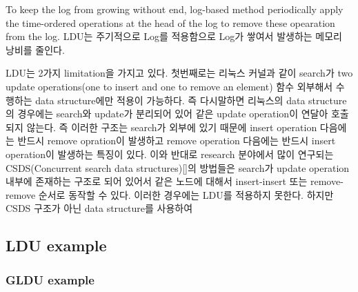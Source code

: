 \ifkor
To keep the log from growing without end, log-based method periodically  apply
the time-ordered operations at the head of the log to remove these opearation
from the log. LDU는 주기적으로 Log를 적용함으로 Log가 쌓여서 발생하는 메모리 낭비를 줄인다.
\else
\fi







\ifkor
LDU는 2가지 limitation을 가지고 있다.  
첫번째로는 리눅스 커널과 같이 search가 two update operations(one to insert and one to remove
an element) 함수 외부해서 수행하는 data structure에만 적용이 가능하다.
즉 다시말하면 리눅스의 data structure의 경우에는 search와 update가 분리되어 있어 같은 update operation이
연달아 호출되지 않는다.
즉 이러한 구조는 search가 외부에 있기 때문에 insert operation 다음에는 반드시  remove opration이 발생하고 
remove operation 다음에는 반드시 insert operation이 발생하는 특징이 있다.
이와 반대로 research 분야에서 많이 연구되는 CSDS(Concurrent search data structures)[]의 방법들은
search가 update operation 내부에 존재하는 구조로 되어 있어서 같은 노드에 대해서 insert-insert 또는
remove-remove 순서로 동작할 수 있다.
이러한 경우에는 LDU를 적용하지 못한다.
하지만 CSDS 구조가 아닌 data structure를 사용하여 
\else
\fi


\subsection{LDU example}

\subsubsection{GLDU example}
%


